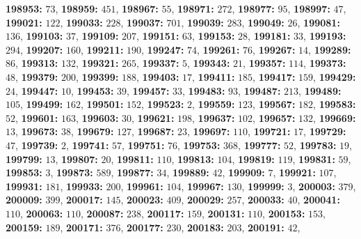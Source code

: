 \textsf{\bfseries 198953:} $73$, \textsf{\bfseries 198959:} $451$, \textsf{\bfseries 198967:} $55$, \textsf{\bfseries 198971:} $272$, \textsf{\bfseries 198977:} $95$, \textsf{\bfseries 198997:} $47$, \textsf{\bfseries 199021:} $122$, \textsf{\bfseries 199033:} $228$, \textsf{\bfseries 199037:} $701$, \textsf{\bfseries 199039:} $283$, \textsf{\bfseries 199049:} $26$, \textsf{\bfseries 199081:} $136$, \textsf{\bfseries 199103:} $37$, \textsf{\bfseries 199109:} $207$, \textsf{\bfseries 199151:} $63$, \textsf{\bfseries 199153:} $28$, \textsf{\bfseries 199181:} $33$, \textsf{\bfseries 199193:} $294$, \textsf{\bfseries 199207:} $160$, \textsf{\bfseries 199211:} $190$, \textsf{\bfseries 199247:} $74$, \textsf{\bfseries 199261:} $76$, \textsf{\bfseries 199267:} $14$, \textsf{\bfseries 199289:} $86$, \textsf{\bfseries 199313:} $132$, \textsf{\bfseries 199321:} $265$, \textsf{\bfseries 199337:} $5$, \textsf{\bfseries 199343:} $21$, \textsf{\bfseries 199357:} $114$, \textsf{\bfseries 199373:} $48$, \textsf{\bfseries 199379:} $200$, \textsf{\bfseries 199399:} $188$, \textsf{\bfseries 199403:} $17$, \textsf{\bfseries 199411:} $185$, \textsf{\bfseries 199417:} $159$, \textsf{\bfseries 199429:} $24$, \textsf{\bfseries 199447:} $10$, \textsf{\bfseries 199453:} $39$, \textsf{\bfseries 199457:} $33$, \textsf{\bfseries 199483:} $93$, \textsf{\bfseries 199487:} $213$, \textsf{\bfseries 199489:} $105$, \textsf{\bfseries 199499:} $162$, \textsf{\bfseries 199501:} $152$, \textsf{\bfseries 199523:} $2$, \textsf{\bfseries 199559:} $123$, \textsf{\bfseries 199567:} $182$, \textsf{\bfseries 199583:} $52$, \textsf{\bfseries 199601:} $163$, \textsf{\bfseries 199603:} $30$, \textsf{\bfseries 199621:} $198$, \textsf{\bfseries 199637:} $102$, \textsf{\bfseries 199657:} $132$, \textsf{\bfseries 199669:} $13$, \textsf{\bfseries 199673:} $38$, \textsf{\bfseries 199679:} $127$, \textsf{\bfseries 199687:} $23$, \textsf{\bfseries 199697:} $110$, \textsf{\bfseries 199721:} $17$, \textsf{\bfseries 199729:} $47$, \textsf{\bfseries 199739:} $2$, \textsf{\bfseries 199741:} $57$, \textsf{\bfseries 199751:} $76$, \textsf{\bfseries 199753:} $368$, \textsf{\bfseries 199777:} $52$, \textsf{\bfseries 199783:} $19$, \textsf{\bfseries 199799:} $13$, \textsf{\bfseries 199807:} $20$, \textsf{\bfseries 199811:} $110$, \textsf{\bfseries 199813:} $104$, \textsf{\bfseries 199819:} $119$, \textsf{\bfseries 199831:} $59$, \textsf{\bfseries 199853:} $3$, \textsf{\bfseries 199873:} $589$, \textsf{\bfseries 199877:} $34$, \textsf{\bfseries 199889:} $42$, \textsf{\bfseries 199909:} $7$, \textsf{\bfseries 199921:} $107$, \textsf{\bfseries 199931:} $181$, \textsf{\bfseries 199933:} $200$, \textsf{\bfseries 199961:} $104$, \textsf{\bfseries 199967:} $130$, \textsf{\bfseries 199999:} $3$, \textsf{\bfseries 200003:} $379$, \textsf{\bfseries 200009:} $399$, \textsf{\bfseries 200017:} $145$, \textsf{\bfseries 200023:} $409$, \textsf{\bfseries 200029:} $257$, \textsf{\bfseries 200033:} $40$, \textsf{\bfseries 200041:} $110$, \textsf{\bfseries 200063:} $110$, \textsf{\bfseries 200087:} $238$, \textsf{\bfseries 200117:} $159$, \textsf{\bfseries 200131:} $110$, \textsf{\bfseries 200153:} $153$, \textsf{\bfseries 200159:} $189$, \textsf{\bfseries 200171:} $376$, \textsf{\bfseries 200177:} $230$, \textsf{\bfseries 200183:} $203$, \textsf{\bfseries 200191:} $42$, 
